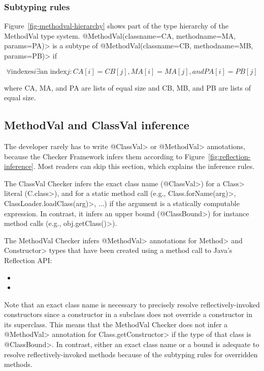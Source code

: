 \subsubsection{Subtyping rules\label{methodval-subtyping-rules}}
Figure~\ref{fig-methodval-hierarchy} shows part of the type hierarchy of  the
MethodVal type system.  \<@MethodVal(classname=CA, methodname=MA, params=PA)> is a subtype of
\<@MethodVal(classname=CB, methodname=MB, params=PB)> if

\[\forall \textrm{indexes} i \exists \textrm{an index} j:  CA[i] = CB[j], MA[i] = MA[j], and PA[i] = PB[j]\]

\noindent
where CA, MA, and PA are lists of equal size and CB, MB, and PB are lists of equal size.



\subsection{MethodVal and ClassVal inference\label{methodval-and-classval-inference}}

The developer rarely has to write \<@ClassVal> or \<@MethodVal>
annotations, because the Checker Framework infers them according to
Figure~\ref{fig:reflection-inference}.  Most readers can skip this
section, which explains the inference rules.



The ClassVal Checker infers the exact class name (\<@ClassVal>) for a
\<Class> literal (\<C.class>), and for a static method call (e.g.,
\<Class.forName(arg)>, \<ClassLoader.loadClass(arg)>, ...) if the argument is a
statically computable expression.  In contrast, it infers an upper bound
(\<@ClassBound>) for instance method calls (e.g., \<obj.getClass()>).

The MethodVal Checker infers \<@MethodVal> annotations for \<Method> and
\<Constructor> types that have been created using a method call to Java's Reflection
API\@:
\begin{itemize}
    \item {}
    \item {}
\end{itemize}

Note that an exact class name is necessary to precisely resolve
reflectively-invoked constructors since a constructor in a subclass does not
override a constructor in its superclass. This means that the MethodVal Checker
does not infer a \<@MethodVal> annotation for \<Class.getConstructor> if the
type of that class is \<@ClassBound>. In contrast, either an exact class name or a bound
is adequate to resolve reflectively-invoked methods because of the subtyping
rules for overridden methods.


